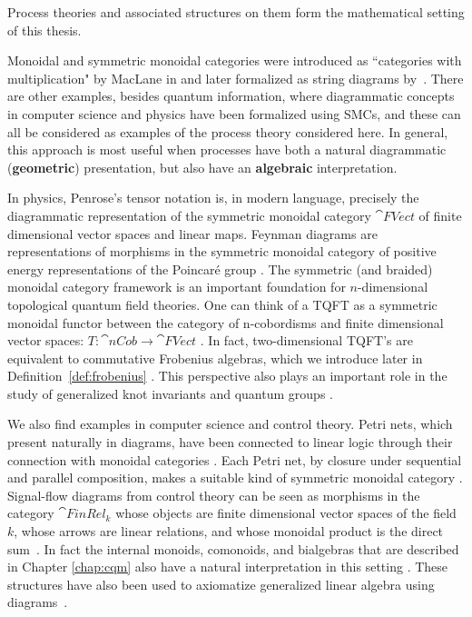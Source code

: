 \noindent Process theories and associated structures on them form the mathematical setting of this thesis.

Monoidal and symmetric monoidal categories were introduced as ``categories with multiplication" by MacLane in \cite{maclane1963natural} and later formalized as string diagrams by~\cite{joyal1991geometry}. There are other examples, besides quantum information, where diagrammatic concepts in computer science and physics have been formalized using SMCs, and these can all be considered as examples of the process theory considered here.  In general, this approach is most useful when processes have both a natural diagrammatic (\textbf{geometric}) presentation, but also have an \textbf{algebraic} interpretation.

In physics, Penrose's tensor notation \cite{penrose1971applications} is, in modern language, precisely the diagrammatic representation of the symmetric monoidal category $\cat{FVect}$ of finite dimensional vector spaces and linear maps. Feynman diagrams are representations of morphisms in the symmetric monoidal category of positive energy representations of the Poincar\'{e} group \cite{baez2009prehistory}. The symmetric (and braided) monoidal category framework is an important foundation for $n$-dimensional topological quantum field theories. One can think of a TQFT as a symmetric monoidal functor between the category of n-cobordisms and finite dimensional vector spaces: $T:\cat{nCob}\to \cat{FVect}$ \cite{atiyah1988topological}. In fact, two-dimensional TQFT's are equivalent to commutative Frobenius algebras, which we introduce later in Definition~\ref{def:frobenius} \cite{abrams1996two,kock2004frobenius}. This perspective also plays an important role in the study of generalized knot invariants \cite{reshetikhin1990ribbon} and quantum groups \cite{baez2009prehistory}. 

We also find examples in computer science and control theory. Petri nets, which present naturally in diagrams, have been connected to linear logic through their connection with monoidal categories \cite{abramsky2008petri,marti1989petri,sassone1998axiomatization}. Each Petri net, by closure under sequential and parallel composition, makes a suitable kind of symmetric monoidal category \cite{marti1989petri,meseguer1990petri}. Signal-flow diagrams from control theory can be seen as morphisms in the category $\cat{FinRel_k}$ whose objects are finite dimensional vector spaces of the field $k$, whose arrows are linear relations, and whose monoidal product is the direct sum~\cite{baez2014categories}.  In fact the internal monoids, comonoids, and bialgebras that are described in Chapter \ref{chap:cqm} also have a natural interpretation in this setting \cite{baez2014categories,bonchi2015full}. These structures have also been used to axiomatize generalized linear algebra using diagrams~\cite{bonchi2014interacting}.
 
